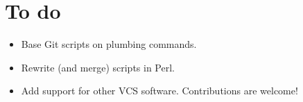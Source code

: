 \documentclass[11pt]{article}
\begin{document}
\section{To do}
\label{sec:todo}
\begin{itemize}
\item Base Git scripts on plumbing commands.
\item Rewrite (and merge) scripts in Perl.
\item Add support for other VCS software.  Contributions are welcome!
\end{itemize}
\end{document}
